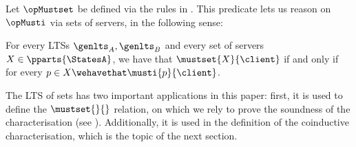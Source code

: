Let $\opMustset$ be defined via the rules in .
This predicate lets us reason on~$\opMusti$ via sets of servers,
in the following sense:
\begin{lemma}
  \label{lem:musti-if-mustset-helper}
  For every LTSs $\genlts_A, \genlts_B$ and every
  set of servers $X \in \pparts{\StatesA}$, we have that
  $\mustset{X}{\client}$ if and only if for every $\serverA \in X
  \wehavethat \musti{\serverA}{\client}$.
\end{lemma}
%
The LTS of sets has two important applications in this paper: 
first, it is used to define the $\mustset{}{}$ relation, on which we rely to prove the
soundness of the characterisation (see ).
%
Additionally, it is used in the definition of the coinductive characterisation,
which is the topic of the next section.





